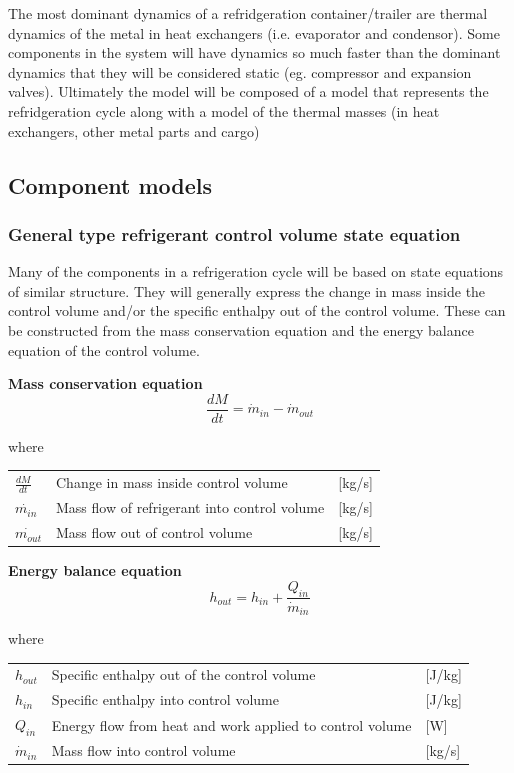 The most dominant dynamics of a refridgeration container/trailer are thermal dynamics of the metal in heat exchangers (i.e. evaporator and condensor). Some components in the system will have dynamics so much faster than the dominant dynamics that they will be considered static (eg. compressor and expansion valves).
Ultimately the model will be composed of a model that represents the refridgeration cycle along with a model of the thermal masses (in heat exchangers, other metal parts and cargo)


\subsection{Component models}

\subsubsection{General type refrigerant control volume state equation}
Many of the components in a refrigeration cycle will be based on state equations of similar structure. They will generally express the change in mass inside the control volume and/or the specific enthalpy out of the control volume. These can be constructed from the mass conservation equation and the energy balance equation of the control volume.

\textbf{Mass conservation equation} \\
\begin{equation} \label{eq:GeneralTypeControlVol_MassConservation}
	\frac{dM}{dt} = \dot{m}_{in} - \dot{m}_{out}
\end{equation}

where 
\begin{center}
	\begin{tabular}{l p{8cm} l}
		$\frac{dM}{dt}$ 	& Change in mass inside control volume & [\si{kg}/\si{s}]\\ 
		$\dot{m_{in}}$ 		& Mass flow of refrigerant into control volume & [\si{kg}/\si{s}]\\
		$\dot{m_{out}}$ 	& Mass flow out of control volume & [\si{kg}/\si{s}]\\
	\end{tabular}
\end{center}

\textbf{Energy balance equation}
\begin{equation}
	h_{out} = h_{in} + \frac{Q_{in}}{\dot{m}_{in}}
\end{equation}

where
\begin{center}
	\begin{tabular}{l p{8cm} l}
		$h_{out}$ 		& Specific enthalpy out of the control volume & [\si{J}/\si{kg}]\\ 
		$h_{in}$ 		& Specific enthalpy into control volume & [\si{J}/\si{kg}]\\ 
		$Q_{in}$ 		& Energy flow from heat and work applied to control volume & [\si{W}]\\
		$\dot{m}_{in}$ 	& Mass flow into control volume & [\si{kg}/\si{s}]\\
	\end{tabular}
\end{center}

